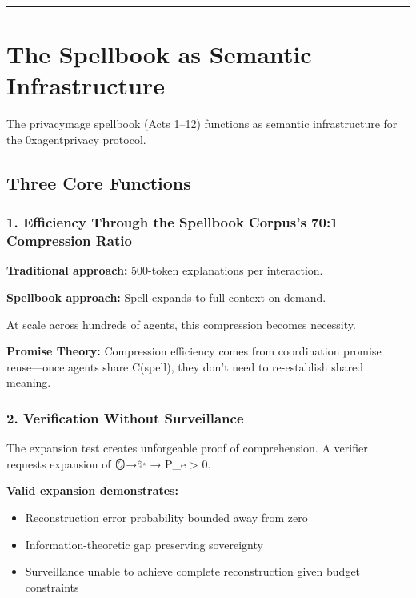 \documentclass[
]{article}
\begin{document}
\begin{center}\rule{0.5\linewidth}{0.5pt}\end{center}

\section{The Spellbook as Semantic
Infrastructure}\label{the-spellbook-as-semantic-infrastructure}

The privacymage spellbook (Acts 1--12) functions as semantic
infrastructure for the 0xagentprivacy protocol.

\subsection{Three Core Functions}\label{three-core-functions}

\subsubsection{1. Efficiency Through the Spellbook Corpus's 70:1
Compression
Ratio}\label{efficiency-through-the-spellbook-corpuss-701-compression-ratio}

\textbf{Traditional approach:} 500-token explanations per interaction.

\textbf{Spellbook approach:} Spell expands to full context on demand.

At scale across hundreds of agents, this compression becomes necessity.

\textbf{Promise Theory:} Compression efficiency comes from coordination
promise reuse---once agents share C(spell), they don't need to
re-establish shared meaning.

\subsubsection{2. Verification Without
Surveillance}\label{verification-without-surveillance}

The expansion test creates unforgeable proof of comprehension. A
verifier requests expansion of 🪞→✨ → P\_e \textgreater{} 0.

\textbf{Valid expansion demonstrates:}

\begin{itemize}
\item
  Reconstruction error probability bounded away from zero
\item
  Information-theoretic gap preserving sovereignty
\item
  Surveillance unable to achieve complete reconstruction given budget
  constraints
\end{itemize}
\end{document}
